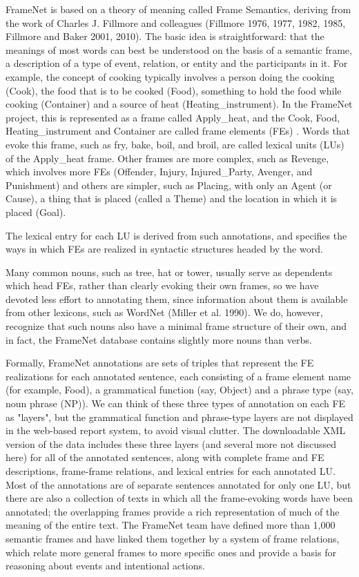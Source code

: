   FrameNet is based on a theory of meaning called Frame Semantics, deriving from the work of Charles J. Fillmore and colleagues (Fillmore 1976, 1977, 1982, 1985, Fillmore and Baker 2001, 2010). The basic idea is straightforward: that the meanings of most words can best be understood on the basis of a semantic frame, a description of a type of event, relation, or entity and the participants in it. For example, the concept of cooking typically involves a person doing the cooking (Cook), the food that is to be cooked (Food), something to hold the food while cooking (Container) and a source of heat (Heating\_instrument). In the FrameNet project, this is represented as a frame called Apply\_heat, and the Cook, Food, Heating\_instrument and Container are called frame elements (FEs) . Words that evoke this frame, such as fry, bake, boil, and broil, are called lexical units (LUs) of the Apply\_heat frame. Other frames are more complex, such as Revenge, which involves more FEs (Offender, Injury, Injured\_Party, Avenger, and Punishment) and others are simpler, such as Placing, with only an Agent (or Cause), a thing that is placed (called a Theme) and the location in which it is placed (Goal).

The lexical entry for each LU is derived from such annotations, and specifies the ways in which FEs are realized in syntactic structures headed by the word.

Many common nouns, such as tree, hat or tower, usually serve as dependents which head FEs, rather than clearly evoking their own frames, so we have devoted less effort to annotating them, since information about them is available from other lexicons, such as WordNet (Miller et al. 1990). We do, however, recognize that such nouns also have a minimal frame structure of their own, and in fact, the FrameNet database contains slightly more nouns than verbs.

Formally, FrameNet annotations are sets of triples that represent the FE realizations for each annotated sentence, each consisting of a frame element name (for example, Food), a grammatical function (say, Object) and a phrase type (say, noun phrase (NP)). We can think of these three types of annotation on each FE as "layers", but the grammatical function and phrase-type layers are not displayed in the web-based report system, to avoid visual clutter. The downloadable XML version of the data includes these three layers (and several more not discussed here) for all of the annotated sentences, along with complete frame and FE descriptions, frame-frame relations, and lexical entries for each annotated LU. Most of the annotations are of separate sentences annotated for only one LU, but there are also a collection of texts in which all the frame-evoking words have been annotated; the overlapping frames provide a rich representation of much of the meaning of the entire text. The FrameNet team have defined more than 1,000 semantic frames and have linked them together by a system of frame relations, which relate more general frames to more specific ones and provide a basis for reasoning about events and intentional actions.


